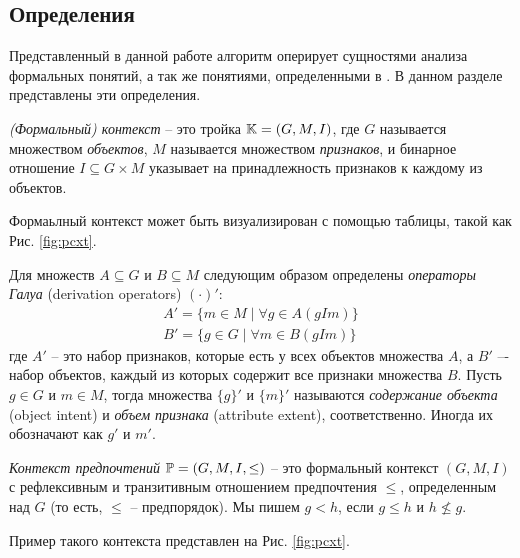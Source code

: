 	\subsection{Определения}
	\label{subsection:definitions}
		Представленный в данной работе алгоритм оперирует сущностями анализа формальных понятий\cite{Ganter:1999}, а так же понятиями, определенными в \cite{Obiedkov:2012:preferences,Obiedkov:2012:modeling}. В данном разделе представлены эти определения.
		
		
		\begin{definition}
		\label{def:context}
			\emph{(Формальный) контекст} – это тройка $\mathbb{K} = (G, M, I)$, где $G$ называется множеством \emph{объектов}, $M$ называется множеством \emph{признаков}, и бинарное отношение ${I \subseteq G \times M}$ указывает на принадлежность признаков к каждому из объектов.
		\end{definition}
		
		Формаьлный контекст может быть визуализирован с помощью таблицы, такой как Рис. \ref{fig:pcxt}.
		
		Для множеств $A \subseteq G$ и $B \subseteq M$ следующим образом определены \emph{операторы Галуа} (derivation operators) $(\cdot)'$:
		\begin{subequations}
			\begin{gather}
			\label{eq:object_intent}
			A'=\{m \in M \mid \forall g \in A (g I m)\}  \\ 
			\label{eq:attribute_extent}
			B'=\{g \in G \mid \forall m \in B (g I m)\}
			\end{gather}
		\end{subequations}
		где $A'$ – это набор признаков, которые есть у всех объектов множества $A$, а $B'$  –- набор объектов, каждый из которых содержит все признаки множества $B$. Пусть $g \in G$ и $m \in M$, тогда множества $\{g\}'$ и $\{m\}'$ называются \emph{содержание объекта} (object intent) и \emph{объем признака} (attribute extent), соответственно. Иногда их обозначают как $g'$ и $m'$.
		
		\begin{definition}
			\emph{Контекст предпочтений} $\mathbb{P} = (G, M, I, \leq)$ – это формальный контекст $(G, M, I)$ с рефлексивным и транзитивным отношением предпочтения $\leq$, определенным над $G$ (то есть, $\leq$ – предпорядок). Мы пишем $g < h$, если $g \leq h$ и $h \not\leq g$.
		\end{definition}
		
		Пример такого контекста представлен на Рис. \ref{fig:pcxt}.
		
